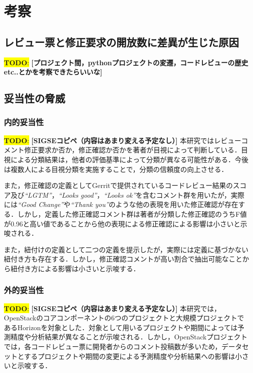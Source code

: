 \documentclass[11pt]{jreport}
\newcommand{\todo}[1]{\colorbox{yellow}{{\bf TODO}:}{\color{red} {\textbf{[#1]}}}}
\begin{document}
\chapter{考察}\label{chap:discussion}

\section{レビュー票と修正要求の開放数に差異が生じた原因}
\todo{プロジェクト間，pythonプロジェクトの変遷，コードレビューの歴史etc..とかを考察できたらいいな}

\section{妥当性の脅威}
\subsection{内的妥当性}
\todo{SIGSEコピペ（内容はあまり変える予定なし）}
本研究ではレビューコメント修正要求か否か，修正確認か否かを著者が目視によって判断している．目視による分類結果は，他者の評価基準によって分類が異なる可能性がある．今後は複数人による目視分類を実施することで，分類の信頼度の向上させる．

また，修正確認の定義としてGerritで提供されているコードレビュー結果のスコア及び\textit{``LGTM''}，\textit{``Looks good''}，\textit{``Looks ok''}を含むコメント群を用いたが，実際には\textit{``Good Change''}や\textit{``Thank you''}のような他の表現を用いた修正確認が存在する．しかし，定義した修正確認コメント群は著者が分類した修正確認のうちF値が0.96と高い値であることから他の表現による修正確認による影響は小さいと示唆される．

また，紐付けの定義として二つの定義を提示したが，実際には定義に基づかない紐付き方も存在する．しかし，修正確認コメントが高い割合で抽出可能なことから紐付き方による影響は小さいと示唆する．

\subsection{外的妥当性}
\todo{SIGSEコピペ（内容はあまり変える予定なし）}
本研究では，OpenStackのコアコンポーネントの6つのプロジェクトと大規模プロジェクトであるHorizonを対象とした．対象として用いるプロジェクトや期間によっては予測精度や分析結果が異なることが示唆される．しかし，OpenStackプロジェクトでは，各コードレビュー票に開発者からのコメント投稿数が多いため，データセットとするプロジェクトや期間の変更による予測精度や分析結果への影響は小さいと示唆する．
\end{document}
